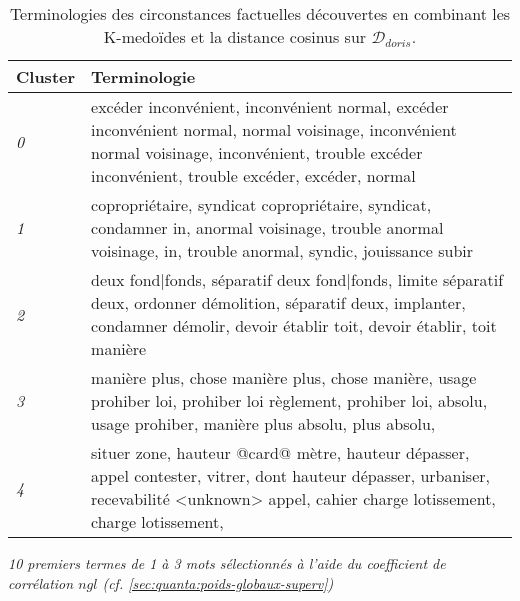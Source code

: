 \begin{table}[ht]
	\centering \scriptsize
	\begin{tabular}{|l|p{}|}
		\hline
		\textbf{Cluster} & \textbf{Terminologie} \\ \hline
		\textit{0} & excéder inconvénient, inconvénient normal, excéder inconvénient normal, normal voisinage, inconvénient normal voisinage, inconvénient, trouble excéder inconvénient, trouble excéder, excéder, normal
		\\ \hline
		\textit{1} & copropriétaire, syndicat copropriétaire, syndicat, condamner in, anormal voisinage, trouble anormal voisinage, in, trouble anormal, syndic, jouissance subir
		\\ \hline
		\textit{2} & deux fond|fonds, séparatif deux fond|fonds, limite séparatif deux, ordonner démolition, séparatif deux, implanter, condamner démolir, devoir établir toit, devoir établir, toit manière
		\\ \hline
		\textit{3} & manière plus, chose manière plus, chose manière, usage prohiber loi, prohiber loi règlement, prohiber loi, absolu, usage prohiber, manière plus absolu, plus absolu, 
		\\ \hline
		\textit{4} & situer zone, hauteur @card@ mètre, hauteur dépasser, appel contester, vitrer, dont hauteur dépasser, urbaniser, recevabilité <unknown> appel, cahier charge lotissement, charge lotissement, 
		\\ \hline
	\end{tabular}
	
	\textit{10 premiers termes de 1 à 3 mots sélectionnés à l'aide du coefficient de corrélation $ngl$ (cf. \ref{sec:quanta:poids-globaux-superv})}
	\caption{Terminologies des circonstances factuelles découvertes en combinant les K-medoïdes et la distance cosinus sur $\mathcal{D}_{doris}$.}\label{tab:similarite:terminologie-clusters-doris}
\end{table}


